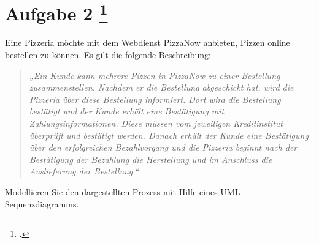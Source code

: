 \documentclass{lehramt-informatik-aufgabe}
\begin{document}
\section{Aufgabe 2
\footcite{66116:2019:03}}

Eine Pizzeria möchte mit dem Webdienst PizzaNow anbieten, Pizzen online
bestellen zu können. Es gilt die folgende Beschreibung:

\begin{quote}
\itshape
„Ein Kunde kann mehrere Pizzen in PizzaNow zu einer Bestellung
zusammenstellen. Nachdem er die Bestellung abgeschickt hat, wird die
Pizzeria über diese Bestellung informiert. Dort wird die Bestellung
bestätigt und der Kunde erhält eine Bestätigung mit
Zahlungsinformationen. Diese müssen vom jeweiligen Kreditinstitut
überprüft und bestätigt werden. Danach erhält der Kunde eine Bestätigung
über den erfolgreichen Bezahlvorgang und die Pizzeria beginnt nach der
Bestätigung der Bezahlung die Herstellung und im Anschluss die
Auslieferung der Bestellung.“
\end{quote}

Modellieren Sie den dargestellten Prozess mit Hilfe eines
UML-Sequenzdiagramms.
\end{document}
